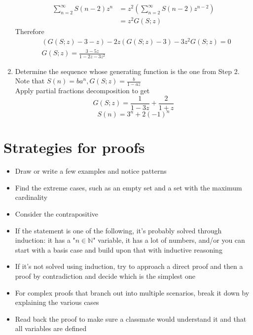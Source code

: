 \documentclass{article}
\begin{document}
\begin{enumerate}
\begin{equation*}
    \end{equation*}
    \begin{equation*}
        \begin{split}
            \sum_{n=2}^{\infty} S(n-2) z^n  & = z^2\left(\sum_{n=2}^{\infty} S(n-2) z^{n-2}\right)\\
            & =z^2G(S;z)
        \end{split}
    \end{equation*}
    Therefore
    \begin{equation*}
        \begin{split}
            &(G(S;z)-3-z)-2z(G(S;z)-3)-3z^2G(S;z)=0\\
            &G(S;z)=\frac{3-5z}{1-2z-3z^2}
        \end{split}
    \end{equation*}
    \item Determine the sequence whose generating function is the one from Step 2. Note that $S(n) = ba^n, G(S;z) = \frac{b}{1-az}$ \\
    Apply partial fractions decomposition to get
    \begin{equation*}
        G(S;z)= \frac{1}{1-3z}+ \frac{2}{1+z}
    \end{equation*}
    \begin{equation*}
        S(n)=3^n + 2(-1)^n
    \end{equation*}
\end{enumerate}

\section{Strategies for proofs}

\begin{itemize}
    \item Draw or write a few examples and notice patterns
    \item Find the extreme cases, such as an empty set and a set with the maximum cardinality
    \item Consider the contrapositive
    \item If the statement is one of the following, it's probably solved through induction: it has a "$n \in \mathbb{N}$" variable, it has a lot of numbers, and/or you can start with a basis case and build upon that with inductive reasoning
    \item If it's not solved using induction, try to approach a direct proof and then a proof by contradiction and decide which is the simplest one
    \item For complex proofs that branch out into multiple scenarios, break it down by explaining the various cases
    \item Read back the proof to make sure a classmate would understand it and that all variables are defined
\end{itemize}
\end{document}
